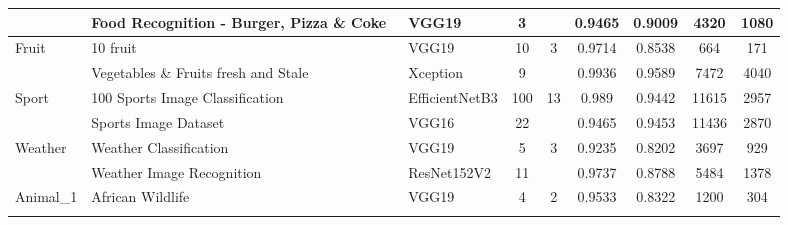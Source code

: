 \documentclass[fontset=macnew,UTF8]{article} %
\begin{document}
\begin{table}[t]
{\begin{tabular}{|l|l|l|c|c|cc|cc|}
				& Food Recognition - Burger,   Pizza \& Coke~\cite{FoodRecognition} & VGG19                  & 3                           &                                         & \multicolumn{1}{c|}{0.9465}    & 0.9009   & \multicolumn{1}{c|}{4320}       & 1080                           \\ \hline
				\multirow{2}{*}{Fruit}     & 10 fruit~\cite{10fruit}                                   & VGG19                  & 10                          & \multirow{2}{*}{3}                      & \multicolumn{1}{c|}{0.9714}    & 0.8538   & \multicolumn{1}{c|}{664}        & 171                            \\ \cline{2-4} \cline{6-9} 
				& Vegetables \& Fruits fresh   and Stale~\cite{Vegetables}     & Xception               & 9                           &                                         & \multicolumn{1}{c|}{0.9936}    & 0.9589   & \multicolumn{1}{c|}{7472}       & 4040                           \\ \hline
				\multirow{2}{*}{Sport}     & 100 Sports Image Classification~\cite{100Sports}            & EfficientNetB3         & 100                         & \multirow{2}{*}{13}                     & \multicolumn{1}{c|}{0.989}     & 0.9442   & \multicolumn{1}{c|}{11615}      & 2957                           \\ \cline{2-4} \cline{6-9} 
				& Sports Image Dataset~\cite{SportsImageDataset}                       & VGG16                  & 22                          &                                         & \multicolumn{1}{c|}{0.9465}    & 0.9453   & \multicolumn{1}{c|}{11436}      & 2870                           \\ \hline
				\multirow{2}{*}{Weather}   & Weather Classification~\cite{WeatherClassification}                     & VGG19                  & 5                           & \multirow{2}{*}{3}                      & \multicolumn{1}{c|}{0.9235}    & 0.8202   & \multicolumn{1}{c|}{3697}       & 929                            \\ \cline{2-4} \cline{6-9} 
				& Weather Image Recognition~\cite{WeatherImageRecognition}                  & ResNet152V2            & 11                          &                                         & \multicolumn{1}{c|}{0.9737}    & 0.8788   & \multicolumn{1}{c|}{5484}       & 1378                           \\ \hline
				\multirow{2}{*}{Animal\_1} & African Wildlife~\cite{AfricanWildlife}                           & VGG19                  & 4                           & \multirow{2}{*}{2}                      & \multicolumn{1}{c|}{0.9533}    & 0.8322   & \multicolumn{1}{c|}{1200}       & 304                            \\ \cline{2-4} \cline{6-9} 

\end{tabular}}
\end{table}
\end{document}
